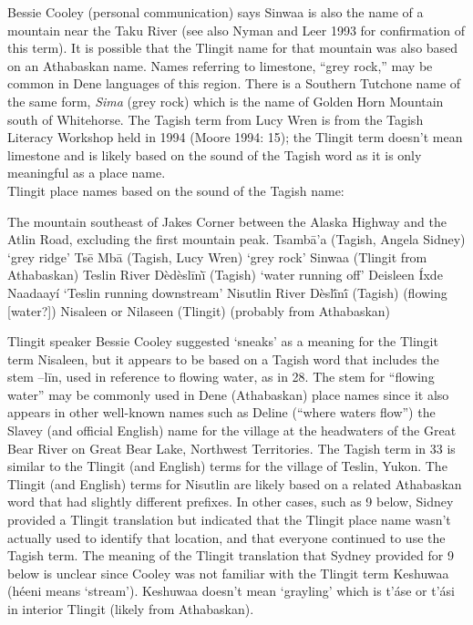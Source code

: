 Bessie Cooley (personal communication) says Sinwaa is also the name of a mountain near the Taku River (see also Nyman and Leer 1993 for confirmation of this term). It is possible that the Tlingit name for that mountain was also based on an Athabaskan name. Names referring to limestone, “grey rock,” may be common in Dene languages of this region. There is a Southern Tutchone name of the same form, \textit{Sima} (grey rock) which is the name of Golden Horn Mountain south of Whitehorse. The Tagish term from Lucy Wren is from the Tagish Literacy Workshop held in 1994 (Moore 1994: 15); the Tlingit term doesn’t mean limestone and is likely based on the sound of the Tagish word as it is only meaningful as a place name.\\

Tlingit place names based on the sound of the Tagish name:
\begin{exe}
 The mountain southeast of Jakes Corner between the Alaska Highway and the Atlin Road, excluding the first mountain peak.
	\sn Tsambā’a (Tagish, Angela Sidney)	`grey ridge'
	\sn Tsē Mbā (Tagish, Lucy Wren)		`grey rock'
	\sn Sinwaa (Tlingit from Athabaskan)
 Teslin River
	\sn Dèdèslīnī̀  (Tagish)			`water running off'
	\sn Deisleen Íxde Naadaayí		`Teslin running downstream'
 Nisutlin River
	\sn Dèslī́nī́ (Tagish)			(flowing [water?])
	\sn Nisaleen or Nilaseen (Tlingit)		(probably from Athabaskan)
\end{exe}



Tlingit speaker Bessie Cooley suggested ‘sneaks’ as a meaning for the Tlingit term Nisaleen, but it appears to be based on a Tagish word that includes the stem –līn, used in reference to flowing water, as in 28. The stem for “flowing water” may be commonly used in Dene (Athabaskan) place names since it also appears in other well-known names such as Deline (“where waters flow”) the Slavey (and official English) name for the village at the headwaters of the Great Bear River on Great Bear Lake, Northwest Territories. The Tagish term in 33 is similar to the Tlingit (and English) terms for the village of Teslin, Yukon. The Tlingit (and English) terms for Nisutlin are likely based on a related Athabaskan word that had slightly different prefixes.
In other cases, such as 9 below, Sidney provided a Tlingit translation but indicated that the Tlingit place name wasn’t actually used to identify that location, and that everyone continued to use the Tagish term. The meaning of the Tlingit translation that Sydney provided for 9 below is unclear since Cooley was not familiar with the Tlingit term Keshuwaa (héeni means ‘stream’). Keshuwaa doesn’t mean ‘grayling’ which is t’áse or t’ási in interior Tlingit (likely from Athabaskan).\\

